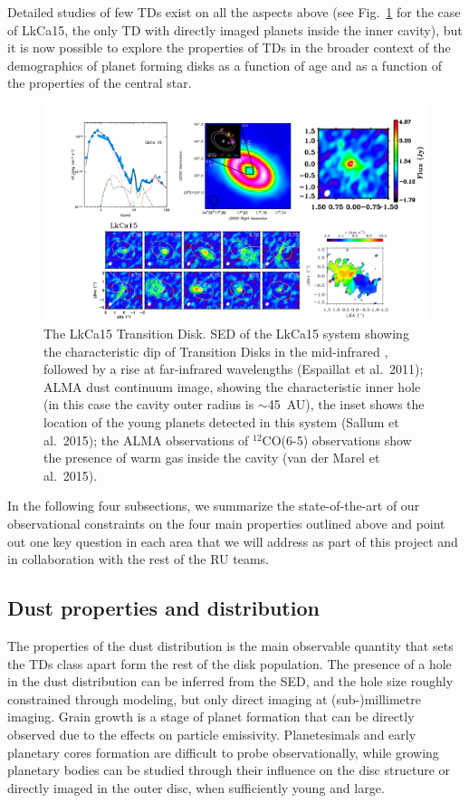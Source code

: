 \documentclass[10pt,fleqn,twoside]{article}
\begin{document}
Detailed studies of few TDs exist on all the aspects above (see Fig.~\ref{f_examples} for the case of LkCa15, the only TD with directly imaged planets inside the inner cavity), but it is now possible to explore the properties of TDs in the broader context of the demographics of planet forming disks as a function of age and as a function of the properties of the central star.  
\begin{figure}
\centerline{\includegraphics[scale=0.5]{Figure_LkCa15.pdf}}
\caption{The LkCa15 Transition Disk.  SED of the LkCa15 system showing the characteristic dip
  of Transition Disks in the mid-infrared , followed by a rise at
  far-infrared wavelengths (Espaillat et al.~2011); ALMA dust continuum
  image, showing the characteristic inner hole (in this case the cavity
  outer radius is $\sim$45~AU), the inset shows the location of the young
  planets detected in this system (Sallum et al.~2015); the ALMA
  observations of $^{12}$CO(6-5) observations show the presence of warm gas
  inside the cavity (van der Marel et al.~2015).}
\label{f_examples}
\end{figure}

In the following four subsections, we summarize the state-of-the-art of our observational constraints on the four main properties outlined above and point out one key question in each area that we will address as part of this project and in collaboration with the rest of the RU teams.

\subsection{Dust properties and distribution} 
The properties of the dust distribution is the main observable quantity that sets the TDs class apart form the rest of the disk population. The presence of a hole in the dust distribution can be inferred from the SED, and the hole size roughly constrained through modeling, but only direct imaging at (sub-)millimetre imaging.
Grain growth is a stage of planet formation that can be directly observed due to the effects on particle emissivity. Planetesimals and early planetary cores formation are difficult to probe observationally, while growing planetary bodies can be studied through their influence on the disc structure or directly imaged in the outer disc, when sufficiently young and large.
\end{document}
